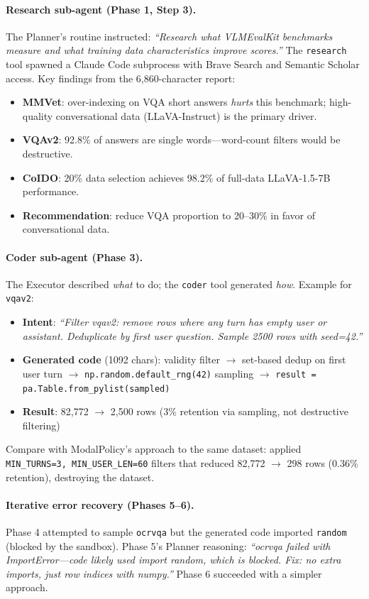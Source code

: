 \paragraph{Research sub-agent (Phase 1, Step 3).}
The Planner's routine instructed: \emph{``Research what VLMEvalKit benchmarks measure and what training data characteristics improve scores.''} The \texttt{research} tool spawned a Claude Code subprocess with Brave Search and Semantic Scholar access. Key findings from the 6,860-character report:

\begin{itemize}
    \item \textbf{MMVet}: over-indexing on VQA short answers \emph{hurts} this benchmark; high-quality conversational data (LLaVA-Instruct) is the primary driver.
    \item \textbf{VQAv2}: 92.8\% of answers are single words---word-count filters would be destructive.
    \item \textbf{CoIDO}: 20\% data selection achieves 98.2\% of full-data LLaVA-1.5-7B performance.
    \item \textbf{Recommendation}: reduce VQA proportion to 20--30\% in favor of conversational data.
\end{itemize}

\paragraph{Coder sub-agent (Phase 3).}
The Executor described \emph{what} to do; the \texttt{coder} tool generated \emph{how}. Example for \texttt{vqav2}:

\begin{itemize}
    \item \textbf{Intent}: \emph{``Filter vqav2: remove rows where any turn has empty user or assistant. Deduplicate by first user question. Sample 2500 rows with seed=42.''}
    \item \textbf{Generated code} (1092 chars): validity filter $\to$ set-based dedup on first user turn $\to$ \texttt{np.random.default\_rng(42)} sampling $\to$ \texttt{result = pa.Table.from\_pylist(sampled)}
    \item \textbf{Result}: 82,772 $\to$ 2,500 rows (3\% retention via sampling, not destructive filtering)
\end{itemize}

\noindent Compare with ModalPolicy's approach to the same dataset: applied \texttt{MIN\_TURNS=3, MIN\_USER\_LEN=60} filters that reduced 82,772 $\to$ 298 rows (0.36\% retention), destroying the dataset.

\paragraph{Iterative error recovery (Phases 5--6).}
Phase 4 attempted to sample \texttt{ocrvqa} but the generated code imported \texttt{random} (blocked by the sandbox). Phase 5's Planner reasoning: \emph{``ocrvqa failed with ImportError---code likely used import random, which is blocked. Fix: no extra imports, just row indices with numpy.''} Phase 6 succeeded with a simpler approach.

